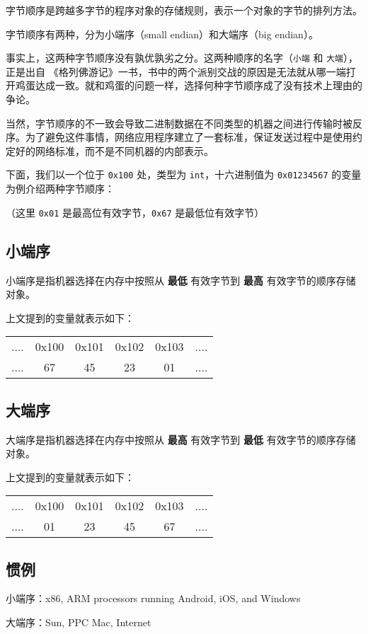 
字节顺序是跨越多字节的程序对象的存储规则，表示一个对象的字节的排列方法。

字节顺序有两种，分为小端序（small endian）和大端序（big endian）。

事实上，这两种字节顺序没有孰优孰劣之分。这两种顺序的名字（\texttt{小端} 和 \texttt{大端}），正是出自 《格列佛游记》一书，书中的两个派别交战的原因是无法就从哪一端打开鸡蛋达成一致。就和鸡蛋的问题一样，选择何种字节顺序成了没有技术上理由的争论。

当然，字节顺序的不一致会导致二进制数据在不同类型的机器之间进行传输时被反序。为了避免这件事情，网络应用程序建立了一套标准，保证发送过程中是使用约定好的网络标准，而不是不同机器的内部表示。

下面，我们以一个位于 \texttt{0x100} 处，类型为 \texttt{int}，十六进制值为 \texttt{0x01234567} 的变量为例介绍两种字节顺序：

（这里 \texttt{0x01} 是最高位有效字节，\texttt{0x67} 是最低位有效字节）

\subsection{小端序}

小端序是指机器选择在内存中按照从 \textbf{最低} 有效字节到 \textbf{最高} 有效字节的顺序存储对象。

上文提到的变量就表示如下：

\begin{tabular}{cccccc}
\hline
....& 0x100& 0x101& 0x102& 0x103& ....\\....& 67& 45& 23& 01& ....\\\hline
\end{tabular}

\subsection{大端序}

大端序是指机器选择在内存中按照从 \textbf{最高} 有效字节到 \textbf{最低} 有效字节的顺序存储对象。

上文提到的变量就表示如下：

\begin{tabular}{cccccc}
\hline
....& 0x100& 0x101& 0x102& 0x103& ....\\....& 01& 23& 45& 67& ....\\\hline
\end{tabular}

\subsection{惯例}

小端序：x86, ARM processors running Android, iOS, and Windows

大端序：Sun, PPC Mac, Internet
